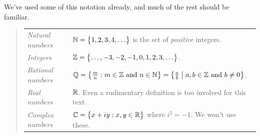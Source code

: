 
We've used some of this notation already, and much of the rest should be familiar.\vspace{-5pt}

\begin{quote}\def\arraystretch{1.15}
	\begin{tabular}{@{}ll}
		\emph{Natural numbers}&$\mathbb{N}=\bigl\{1,2,3,4,\ldots\bigr\}$ is the set of \emph{positive} integers.\\
		\emph{Integers}&$\mathbb{Z}=\bigl\{\ldots,-3,-2,-1,0,1,2,3,\ldots\bigr\}$.\\
		\emph{Rational numbers}&$\mathbb{Q}=\bigl\{\frac mn:m\in\mathbb{Z}\text{ and }n\in\mathbb{N}\bigr\} =\bigl\{\frac ab\bigm| a,b\in\mathbb{Z}\text{ and }b\neq 0\bigr\}$.\\
		\emph{Real numbers}&$\mathbb{R}$. Even a rudimentary definition is too involved for this text.\footnotemark\\
		\emph{Complex numbers}&$\mathbb{C}=\bigl\{x+iy:x,y\in\mathbb{R}\bigr\}$ where $i^2=-1$. We won't use these.
	\end{tabular}
\end{quote}

\vspace{-10pt}
	

